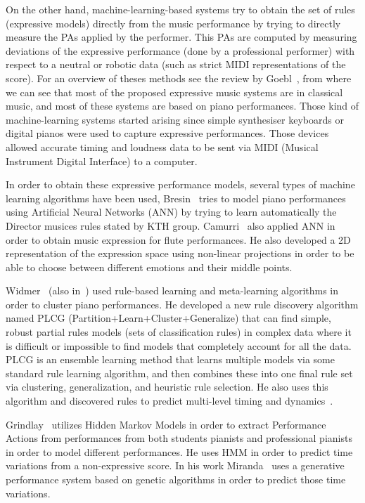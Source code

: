 

On the other hand, machine-learning-based systems try to obtain the set of rules (expressive models) directly from the music performance by trying to directly measure the PAs applied by the performer. This PAs are computed by measuring deviations of the expressive performance (done by a professional performer) with respect to a neutral or robotic data (such as strict MIDI representations of the score). For an overview of theses methods see the review by Goebl~\cite{Goebl2005}, from where we can see that most of the proposed expressive music systems are in classical music, and most of these systems are based on piano performances. Those kind of machine-learning systems started arising since simple synthesiser keyboards or digital pianos were used to capture expressive performances. Those devices allowed accurate timing and loudness data to be sent via MIDI (Musical Instrument Digital Interface) to a computer.

In order to obtain these expressive performance models, several types of machine learning algorithms have been used, Bresin~\cite{Bresin1998} tries to model piano performances using Artificial Neural Networks (ANN) by trying to learn automatically the Director musices rules stated by KTH group. Camurri~\cite{Camurri2000} also applied ANN in order to obtain music expression for flute performances. He also developed a 2D representation of the expression space using non-linear projections in order to be able to choose between different emotions and their middle points.

Widmer~\cite{Widmer2003a} (also in~\cite{Widmer2003}) used rule-based learning and meta-learning algorithms in order to cluster piano performances. He developed a new rule discovery algorithm named PLCG (Partition+Learn+Cluster+Generalize) that can find simple, robust partial rules models (sets of classification rules) in complex data where it is difficult or impossible to find models that completely account for all the data. PLCG is an ensemble learning method that learns multiple models via some standard rule learning algorithm, and then combines these into one final rule set via clustering, generalization, and heuristic rule selection. He also uses this algorithm and discovered rules to predict multi-level timing and dynamics~\cite{Widmer2003}.

Grindlay~\cite{Grindlay2006} utilizes Hidden Markov Models in order to extract Performance Actions from performances from both students pianists and professional pianists in order to model different performances. He uses HMM in order to predict time variations from a non-expressive score. In his work Miranda~\cite{Miranda2010} uses a generative performance system based on genetic algorithms in order to predict those time variations. 

